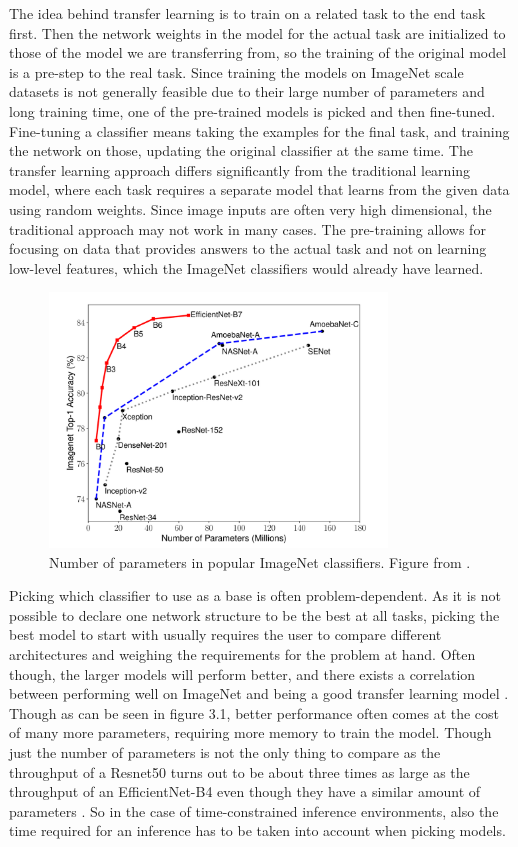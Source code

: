 The idea behind transfer learning is to train on a related task to the end task first. Then the network weights in the model for the actual task are initialized to those of the model we are transferring from, so the training of the original model is a pre-step to the real task. Since training the models on ImageNet scale datasets is not generally feasible due to their large number of parameters and long training time, one of the pre-trained models is picked and then fine-tuned. Fine-tuning a classifier means taking the examples for the final task, and training the network on those, updating the original classifier at the same time. The transfer learning approach differs significantly from the traditional learning model, where each task requires a separate model that learns from the given data using random weights. Since image inputs are often very high dimensional, the traditional approach may not work in many cases. The pre-training allows for focusing on data that provides answers to the actual task and not on learning low-level features, which the ImageNet classifiers would already have learned.

\begin{figure}[h!] 
\centering 
\includegraphics[width=0.8\textwidth]{imgs/imagenet_parameters.png}
\caption{Number of parameters in popular ImageNet classifiers. Figure from \citep{efficientNet}.\label{fig:params}}
\end{figure}

Picking which classifier to use as a base is often problem-dependent. As it is not possible to declare one network structure to be the best at all tasks, picking the best model to start with usually requires the user to compare different architectures and weighing the requirements for the problem at hand. Often though, the larger models will perform better, and there exists a correlation between performing well on ImageNet and being a good transfer learning model \citep{betterTransfer}. Though as can be seen in figure 3.1, better performance often comes at the cost of many more parameters, requiring more memory to train the model. Though just the number of parameters is not the only thing to compare as the throughput of a Resnet50 turns out to be about three times as large as the throughput of an EfficientNet-B4 even though they have a similar amount of parameters \citep{classifierPerformance}. So in the case of time-constrained inference environments, also the time required for an inference has to be taken into account when picking models.

